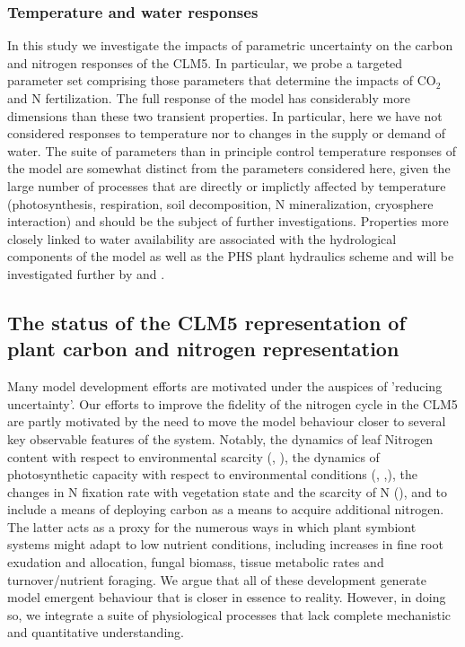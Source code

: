 \documentclass[draft,linenumbers]{agujournal}
\begin{document}
\subsubsection{Temperature and water responses}
In this study we investigate the impacts of parametric uncertainty on the carbon and nitrogen responses of the CLM5. In particular, we probe a targeted parameter set comprising those parameters that determine the impacts of CO$_{2}$ and N fertilization. The full response of the model has considerably more dimensions than these two transient properties. In particular, here we have not considered responses to temperature nor to changes in the supply or demand of water. The suite of parameters than in principle control temperature responses of the model are somewhat distinct from the parameters considered here, given the large number of processes that are directly or implictly affected by temperature (photosynthesis, respiration, soil decomposition, N mineralization, cryosphere interaction) and should be the subject of further investigations. Properties more closely linked to water availability are associated with the hydrological components of the model as well as the PHS plant hydraulics scheme and will be investigated further by \cite{dagon} and \cite{kennedy}. 
 

\subsection{The status of the CLM5 representation of plant carbon and nitrogen representation}
Many model development efforts are motivated under the auspices of 'reducing uncertainty'.  Our efforts to improve the fidelity of the nitrogen cycle in the CLM5 are partly motivated by the need to move the model behaviour closer to several key observable features of the system. Notably, the dynamics of leaf Nitrogen content with respect to environmental scarcity (\cite{zaehle2014}, \cite{brzostek2014}), the dynamics of photosynthetic capacity with respect to environmental conditions (\cite{xu2012}, \cite{ali2016},\cite{rogers2017}), the changes in N fixation rate with vegetation state and the scarcity of N (\cite{vitousek2002}), and to include a means of deploying carbon as a means to acquire additional nitrogen. The latter acts as a proxy for the numerous ways in which plant symbiont systems might adapt to low nutrient conditions, including increases in fine root exudation and allocation, fungal biomass, tissue metabolic rates and turnover/nutrient foraging.  We argue that all of these development generate model emergent behaviour that is closer in essence to reality. However, in doing so, we integrate a suite of physiological processes that lack complete mechanistic and quantitative understanding.
\end{document}
